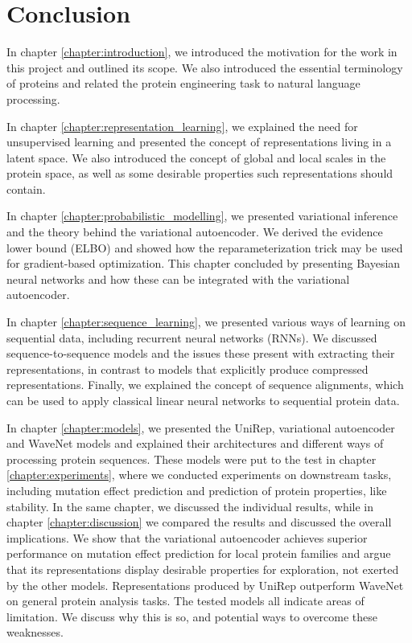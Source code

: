 \chapter{Conclusion}
\label{chapter:conclusion}

In chapter \ref{chapter:introduction}, we introduced the motivation for the work in this project and outlined its scope. We also introduced the essential terminology of proteins and related the protein engineering task to natural language processing.

In chapter \ref{chapter:representation_learning}, we explained the need for unsupervised learning and presented the concept of representations living in a latent space. We also introduced the concept of global and local scales in the protein space, as well as some desirable properties such representations should contain.

In chapter \ref{chapter:probabilistic_modelling}, we presented variational inference and the theory behind the variational autoencoder. We derived the evidence lower bound (ELBO) and showed how the reparameterization trick may be used for gradient-based optimization. This chapter concluded by presenting Bayesian neural networks and how these can be integrated with the variational autoencoder.

In chapter \ref{chapter:sequence_learning}, we presented various ways of learning on sequential data, including recurrent neural networks (RNNs). We discussed sequence-to-sequence models and the issues these present with extracting their representations, in contrast to models that explicitly produce compressed representations. Finally, we explained the concept of sequence alignments, which can be used to apply classical linear neural networks to sequential protein data.

In chapter \ref{chapter:models}, we presented the UniRep, variational autoencoder and WaveNet models and explained their architectures and different ways of processing protein sequences. These models were put to the test in chapter \ref{chapter:experiments}, where we conducted experiments on downstream tasks, including mutation effect prediction and prediction of protein properties, like stability. In the same chapter, we discussed the individual results, while in chapter \ref{chapter:discussion} we compared the results and discussed the overall implications. We show that the variational autoencoder achieves superior performance on mutation effect prediction for local protein families and argue that its representations display desirable properties for exploration, not exerted by the other models. Representations produced by UniRep outperform WaveNet on general protein analysis tasks. The tested models all indicate areas of limitation. We discuss why this is so, and potential ways to overcome these weaknesses.

